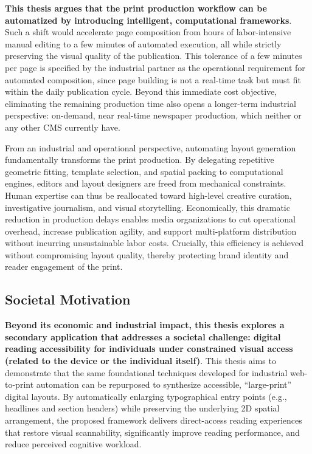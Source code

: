 \textbf{This thesis argues that the print production workflow can be automatized  by introducing intelligent, computational frameworks}. Such a shift would accelerate page composition from hours of labor-intensive manual editing to a few minutes of automated execution, all while strictly preserving the visual quality of the publication. This tolerance of a few minutes per page is specified by the industrial partner as the operational requirement for automated composition, since page building is not a real-time task but must fit within the daily publication cycle. Beyond this immediate cost objective, eliminating the remaining production time also opens a longer-term industrial perspective: on-demand, near real-time newspaper production, which neither \melody or any other CMS currently have.

From an industrial and operational perspective, automating layout generation fundamentally transforms the print production. By delegating repetitive geometric fitting, template selection, and spatial packing to computational engines, editors and layout designers are freed from mechanical constraints. Human expertise can thus be reallocated toward high-level creative curation, investigative journalism, and visual storytelling. Economically, this dramatic reduction in production delays enables media organizations to cut operational overhead, increase publication agility, and support multi-platform distribution without incurring unsustainable labor costs. Crucially, this efficiency is achieved without compromising layout quality, thereby protecting brand identity and reader engagement of the print.

\subsection{Societal Motivation}

\textbf{Beyond its economic and industrial impact, this thesis explores a secondary application that addresses a societal challenge: digital reading accessibility for individuals under constrained visual access (related to the device or the individual itself)}. This thesis aims to demonstrate that the same foundational techniques developed for industrial web-to-print automation can be repurposed to synthesize accessible, ``large-print'' digital layouts. By automatically enlarging typographical entry points (e.g., headlines and section headers) while preserving the underlying 2D spatial arrangement, the proposed framework delivers direct-access reading experiences that restore visual scannability, significantly improve reading performance, and reduce perceived cognitive workload.

